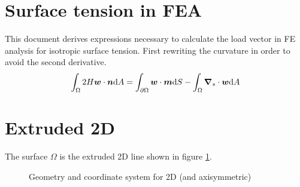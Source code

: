 \documentclass[a4paper,11pt]{article}
\renewcommand{\to}[1]{\text{\boldmath $#1$}} %
\newcommand{\intd}[1]{\mathrm{d}#1}
\begin{document}
\section{Surface tension in FEA}
This document derives expressions necessary to calculate the load vector in FE analysis for isotropic surface tension. First rewriting the curvature in order to avoid the second derivative.
\begin{align}
 \int_\Omega 2 H \to w\cdot \to n\intd A = \int_{\partial\Omega} \to w\cdot\to m\intd S - \int_\Omega \to \nabla_s \cdot \to w \intd A
 \label{eq:curvature}
\end{align}

\section{Extruded 2D}
The surface $\Omega$ is the extruded 2D line shown in figure \ref{fig:extruded}.
\begin{figure}[htpb]
 \centering
 \caption{Geometry and coordinate system for 2D (and axisymmetric)}
 \label{fig:extruded}
\end{figure}
\end{document}
